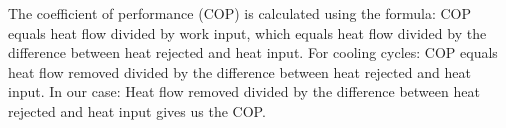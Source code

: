 The coefficient of performance (COP) is calculated using the formula:  
COP equals heat flow divided by work input, which equals heat flow divided by the difference between heat rejected and heat input.  
For cooling cycles:  
COP equals heat flow removed divided by the difference between heat rejected and heat input.  
In our case:  
Heat flow removed divided by the difference between heat rejected and heat input gives us the COP.